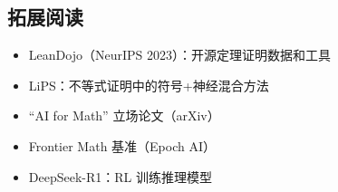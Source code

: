 \documentclass[a4paper]{article}
\begin{document}
\subsection{拓展阅读}
\begin{itemize}
    \item LeanDojo（NeurIPS 2023）：开源定理证明数据和工具
    \item LiPS：不等式证明中的符号+神经混合方法
    \item ``AI for Math'' 立场论文（arXiv）
    \item Frontier Math 基准（Epoch AI）
    \item DeepSeek-R1：RL 训练推理模型
\end{itemize}
\end{document}
